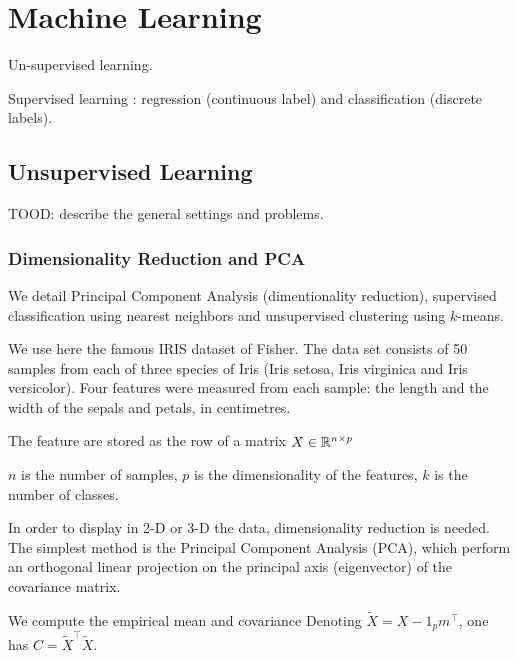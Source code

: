 
\chapter{Machine Learning}



Un-supervised learning.

Supervised learning : regression (continuous label) and classification (discrete labels).

\section{Unsupervised Learning}

TOOD: describe the general settings and problems. 


\subsection{Dimensionality Reduction and PCA}

We detail Principal Component Analysis (dimentionality reduction), supervised classification using nearest neighbors
and unsupervised clustering using $k$-means.


We use here the famous
IRIS dataset of Fisher. 
The data set consists of 50 samples from each of three species of Iris (Iris setosa, Iris virginica and Iris versicolor).
 Four features were measured from each sample: the length and the width of the sepals and petals, in centimetres. 


The feature are stored as the row of a matrix $X \in \mathbb{R}^{n \times p}$

$n$ is the number of samples, $p$ is the dimensionality of the features,
$k$ is the number of classes.


In order to display in 2-D or 3-D the data, dimensionality reduction is needed.
The simplest method is the Principal Component Analysis (PCA), 
which perform an orthogonal linear projection on the principal axis (eigenvector) of the
covariance matrix.

We compute the empirical mean
and  covariance
Denoting $\tilde X = X - 1_p m^\top $, one has $C=\tilde X^\top
\tilde X$. 

